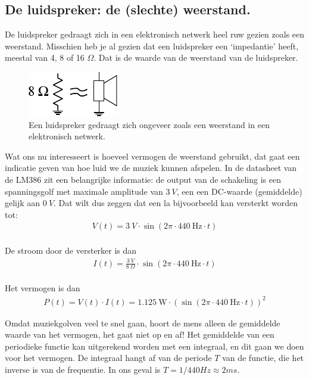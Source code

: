 \documentclass{article}
\begin{document}
		\subsection{De luidspreker: de (slechte) weerstand.} 
		
			De luidspreker gedraagt zich in een elektronisch netwerk heel ruw gezien zoals een weerstand. Misschien heb je al gezien dat een luidspreker een `impedantie' heeft, meestal van 4, 8 of 16 $\Omega$. Dat is de waarde van de weerstand van de luidspreker.

			\begin{figure}[htbp]
				\centering
				\includegraphics[scale=1.5]{luidspreker}
				\caption{Een luidspreker gedraagt zich ongeveer zoals een weerstand in een elektronisch netwerk.}
				\label{fig:luidspreker}
			\end{figure}

			Wat ons nu interesseert is hoeveel vermogen de weerstand gebruikt, dat gaat een indicatie geven van hoe luid we de muziek kunnen afspelen.
			In de datasheet van de LM386 zit  een belangrijke informatie: de output van de schakeling is een spanningsgolf met maximale amplitude van $3~V$, een een DC-waarde (gemiddelde) gelijk aan $0~V$.
			Dat wilt dus zeggen dat een la bijvoorbeeld kan versterkt worden tot:
			\begin{align}
				V(t) = 3~V \cdot \sin (2\pi \cdot 440~\text{Hz} \cdot t) \\
			\end{align}

			De stroom door de versterker is dan 
				\begin{align}
				I(t) = \frac{3~V}{8~\Omega} \cdot \sin (2\pi \cdot 440~\text{Hz} \cdot t) \\
			\end{align}

			Het vermogen is dan
			\begin{align}
				P(t) = V(t) \cdot I(t) = 1.125~\text{W} \cdot \left( \sin \left(2\pi \cdot 440~\text{Hz} \cdot t\right) \right)^2
			\end{align}

			Omdat muziekgolven veel te snel gaan, hoort de mens alleen de gemiddelde waarde van het vermogen, het gaat niet op en af! 
			Het gemiddelde van een periodieke functie kan uitgerekend worden met een integraal, en dit gaan we doen voor het vermogen. 
			De integraal hangt af van de periode $T$ van de functie, die het inverse is van de frequentie. In ons geval is $T = 1/440Hz \approx 2 ms$.
\end{document}

